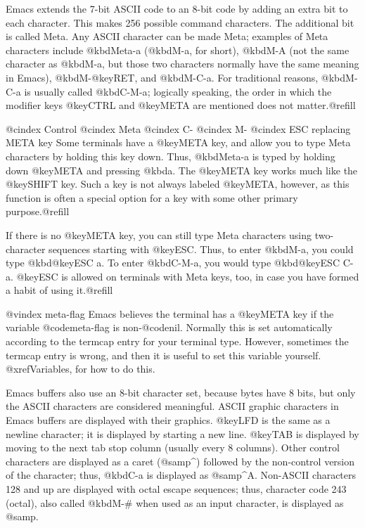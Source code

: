{{  Emacs extends the 7-bit ASCII code to an 8-bit code by adding an extra
bit to each character.  This makes 256 possible command characters.  The
additional bit is called Meta.  Any ASCII character can be made Meta;
examples of Meta characters include @kbd{Meta-a} (@kbd{M-a}, for short),
@kbd{M-A} (not the same character as @kbd{M-a}, but those two characters
normally have the same meaning in Emacs), @kbd{M-@key{RET}}, and
@kbd{M-C-a}.  For traditional reasons, @kbd{M-C-a} is usually called
@kbd{C-M-a}; logically speaking, the order in which the modifier keys
@key{CTRL} and @key{META} are mentioned does not matter.@refill

@cindex Control
@cindex Meta
@cindex C-
@cindex M-
@cindex ESC replacing META key
  Some terminals have a @key{META} key, and allow you to type Meta
characters by holding this key down.  Thus, @kbd{Meta-a} is typed by
holding down @key{META} and pressing @kbd{a}.  The @key{META} key works
much like the @key{SHIFT} key.  Such a key is not always labeled
@key{META}, however, as this function is often a special option for a key
with some other primary purpose.@refill

  If there is no @key{META} key, you
can still type Meta characters using two-character sequences starting with
@key{ESC}.  Thus, to enter @kbd{M-a}, you could type @kbd{@key{ESC} a}.  To
enter @kbd{C-M-a}, you would type @kbd{@key{ESC} C-a}.  @key{ESC} is
allowed on terminals with Meta keys, too, in case you have formed a habit
of using it.@refill

@vindex meta-flag
  Emacs believes the terminal has a @key{META} key if the variable
@code{meta-flag} is non-@code{nil}.  Normally this is set automatically
according to the termcap entry for your terminal type.  However, sometimes
the termcap entry is wrong, and then it is useful to set this variable
yourself.  @xref{Variables}, for how to do this.

  Emacs buffers also use an 8-bit character set, because bytes have 8 bits,
but only the ASCII characters are considered meaningful.  ASCII graphic
characters in Emacs buffers are displayed with their graphics.  @key{LFD}
is the same as a newline character; it is displayed by starting a new line.
@key{TAB} is displayed by moving to the next tab stop column (usually every
8 columns).  Other control characters are displayed as a caret (@samp{^})
followed by the non-control version of the character; thus, @kbd{C-a} is
displayed as @samp{^A}.  Non-ASCII characters 128 and up are displayed with
octal escape sequences; thus, character code 243 (octal), also called
@kbd{M-#} when used as an input character, is displayed as @samp{}.

}}
